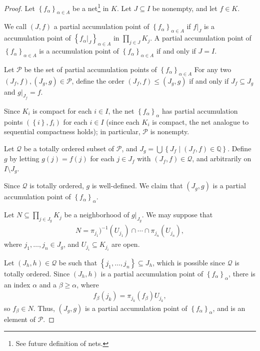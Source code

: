 \documentclass[12pt]{extarticle}
\newcommand{\Q}{\mathbb{Q}}
\newcommand{\set}[1]{\left\{#1\right\}}
\theoremstyle{plain}
\theoremstyle{definition}
\theoremstyle{note}
\renewcommand{\newline}{\hfill\break}
\begin{document}
\begin{proof}
  Let $\set{f_{\alpha}}_{\alpha\in A}$ be a net\footnote{See future definition of nets.} in $K$. Let $J\subseteq I$ be nonempty, and let $f\in K$.\newline

  We call $\left(J,f\right)$ a partial accumulation point of $\set{f_{\alpha}}_{\alpha \in A}$ if $f\vert_{J}$ is a accumulation point of $\set{f_{\alpha}\vert_{J}}_{\alpha \in A}$ in $\displaystyle \prod_{j\in J}K_j$. A partial accumulation point of $\set{f_{\alpha}}_{\alpha \in A}$ is a accumulation point of $\set{f_{\alpha}}_{\alpha\in A}$  if and only if $J = I$.\newline

  Let $\mathcal{P}$ be the set of partial accumulation points of $\set{f_{\alpha}}_{\alpha \in A}$ For any two $\left(J_f,f\right),\left(J_g,g\right)\in \mathcal{P}$, define the order $\left(J_f,f\right)\leq \left(J_g,g\right)$ if and only if $J_f\subseteq J_g$ and $g\vert_{J_f} = f$.\newline

  Since $K_i$ is compact for each $i\in I$, the net $\set{f_{\alpha}}_{\alpha}$ has partial accumulation points $\left(\set{i},f_i\right)$ for each $i\in I$ (since each $K_i$ is compact, the net analogue to sequential compactness holds); in particular, $\mathcal{P}$ is nonempty.\newline

  Let $\mathcal{Q}$ be a totally ordered subset of $\mathcal{P}$, and $J_g = \bigcup\set{J_f\mid \left(J_f,f\right)\in \Q}$. Define $g$ by letting $g(j) = f(j)$ for each $j\in J_f$ with $\left(J_f,f\right)\in \mathcal{Q}$, and arbitrarily on $I\setminus J_g$.\newline

  Since $\mathcal{Q}$ is totally ordered, $g$ is well-defined. We claim that $\left(J_g,g\right)$ is a partial accumulation point of $\set{f_{\alpha}}_{\alpha}$.\newline

  Let $\displaystyle N\subseteq \prod_{j\in J_g} K_j$ be a neighborhood of $g\vert_{J_g}$. We may suppose that
  \begin{align*}
    N = \pi_{j_1})^{-1}\left(U_{j_1}\right) \cap \cdots \cap \pi_{j_n}\left(U_{j_n}\right),
  \end{align*}
  where $j_1,\dots,j_n\in J_g$, and $U_{j_i} \subseteq K_{j_i}$ are open.\newline

  Let $\left(J_{h},h\right)\in \mathcal{Q}$ be such that $\set{j_1,\dots,j_n}\subseteq J_h$, which is possible since $\mathcal{Q}$ is totally ordered. Since $\left(J_h,h\right)$ is a partial accumulation point of $\set{f_{\alpha}}_{\alpha}$, there is an index $\alpha$ and a $\beta \geq \alpha$, where
  \begin{align*}
    f_{\beta}\left(j_k\right) = \pi_{j_k}\left(f_{\beta}\right)U_{j_k},
  \end{align*}
  so $f_{\beta}\in N$. Thus, $\left(J_g,g\right)$ is a partial accumulation point of $\set{f_{\alpha}}_{\alpha}$, and is an element of $\mathcal{P}$.\newline


\end{proof}
\end{document}
